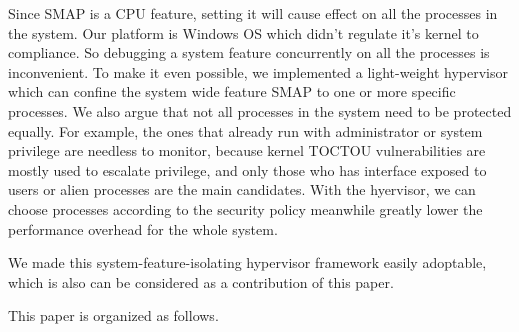 
Since SMAP is a CPU feature, setting it will cause effect on all the processes in the system. Our platform is Windows OS which didn't regulate it's kernel to compliance. So debugging a system feature concurrently on all the processes is inconvenient. To make it even possible, we implemented a light-weight hypervisor which can confine the system wide feature SMAP to one or more specific processes. We also argue that not all processes in the system need to be protected equally. For example, the ones that already run with administrator or system privilege are needless to monitor, because kernel TOCTOU vulnerabilities are mostly used to escalate privilege, and only those who has interface exposed to users or alien processes are the main candidates. With the hyervisor, we can choose processes according to the security policy meanwhile greatly lower the performance overhead for the whole system. 

We made this system-feature-isolating hypervisor framework easily adoptable, which is also can be considered as a contribution of this paper.


This paper is organized as follows. 

